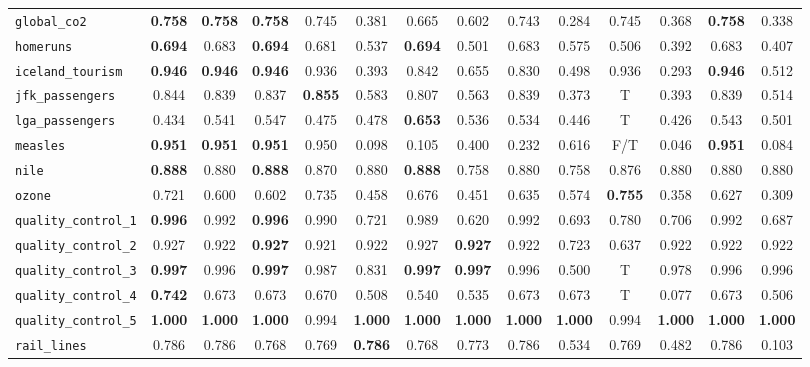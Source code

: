\begin{tabular}{lccccccccccccc}
\verb+global_co2+ & \textbf{0.758} & \textbf{0.758} & \textbf{0.758} & 0.745 & 0.381 & 0.665 & 0.602 & 0.743 & 0.284 & 0.745 & 0.368 & \textbf{0.758} & 0.338\\
\verb+homeruns+ & \textbf{0.694} & 0.683 & \textbf{0.694} & 0.681 & 0.537 & \textbf{0.694} & 0.501 & 0.683 & 0.575 & 0.506 & 0.392 & 0.683 & 0.407\\
\verb+iceland_tourism+ & \textbf{0.946} & \textbf{0.946} & \textbf{0.946} & 0.936 & 0.393 & 0.842 & 0.655 & 0.830 & 0.498 & 0.936 & 0.293 & \textbf{0.946} & 0.512\\
\verb+jfk_passengers+ & 0.844 & 0.839 & 0.837 & \textbf{0.855} & 0.583 & 0.807 & 0.563 & 0.839 & 0.373 & T & 0.393 & 0.839 & 0.514\\
\verb+lga_passengers+ & 0.434 & 0.541 & 0.547 & 0.475 & 0.478 & \textbf{0.653} & 0.536 & 0.534 & 0.446 & T & 0.426 & 0.543 & 0.501\\
\verb+measles+ & \textbf{0.951} & \textbf{0.951} & \textbf{0.951} & 0.950 & 0.098 & 0.105 & 0.400 & 0.232 & 0.616 & F/T & 0.046 & \textbf{0.951} & 0.084\\
\verb+nile+ & \textbf{0.888} & 0.880 & \textbf{0.888} & 0.870 & 0.880 & \textbf{0.888} & 0.758 & 0.880 & 0.758 & 0.876 & 0.880 & 0.880 & 0.880\\
\verb+ozone+ & 0.721 & 0.600 & 0.602 & 0.735 & 0.458 & 0.676 & 0.451 & 0.635 & 0.574 & \textbf{0.755} & 0.358 & 0.627 & 0.309\\
\verb+quality_control_1+ & \textbf{0.996} & 0.992 & \textbf{0.996} & 0.990 & 0.721 & 0.989 & 0.620 & 0.992 & 0.693 & 0.780 & 0.706 & 0.992 & 0.687\\
\verb+quality_control_2+ & 0.927 & 0.922 & \textbf{0.927} & 0.921 & 0.922 & 0.927 & \textbf{0.927} & 0.922 & 0.723 & 0.637 & 0.922 & 0.922 & 0.922\\
\verb+quality_control_3+ & \textbf{0.997} & 0.996 & \textbf{0.997} & 0.987 & 0.831 & \textbf{0.997} & \textbf{0.997} & 0.996 & 0.500 & T & 0.978 & 0.996 & 0.996\\
\verb+quality_control_4+ & \textbf{0.742} & 0.673 & 0.673 & 0.670 & 0.508 & 0.540 & 0.535 & 0.673 & 0.673 & T & 0.077 & 0.673 & 0.506\\
\verb+quality_control_5+ & \textbf{1.000} & \textbf{1.000} & \textbf{1.000} & 0.994 & \textbf{1.000} & \textbf{1.000} & \textbf{1.000} & \textbf{1.000} & \textbf{1.000} & 0.994 & \textbf{1.000} & \textbf{1.000} & \textbf{1.000}\\
\verb+rail_lines+ & 0.786 & 0.786 & 0.768 & 0.769 & \textbf{0.786} & 0.768 & 0.773 & 0.786 & 0.534 & 0.769 & 0.482 & 0.786 & 0.103\\

\end{tabular}
